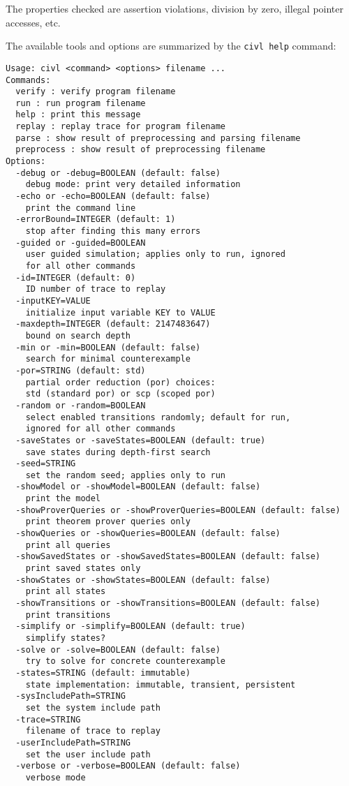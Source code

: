 \documentclass[11pt]{book}
\begin{document}
The properties checked are assertion violations, division by zero,
illegal pointer accesses, etc.

The available tools and options are summarized by the \texttt{civl
  help} command:

\begin{verbatim}
Usage: civl <command> <options> filename ...
Commands:
  verify : verify program filename
  run : run program filename
  help : print this message
  replay : replay trace for program filename
  parse : show result of preprocessing and parsing filename
  preprocess : show result of preprocessing filename
Options:
  -debug or -debug=BOOLEAN (default: false)
    debug mode: print very detailed information
  -echo or -echo=BOOLEAN (default: false)
    print the command line
  -errorBound=INTEGER (default: 1)
    stop after finding this many errors
  -guided or -guided=BOOLEAN
    user guided simulation; applies only to run, ignored
    for all other commands
  -id=INTEGER (default: 0)
    ID number of trace to replay
  -inputKEY=VALUE
    initialize input variable KEY to VALUE
  -maxdepth=INTEGER (default: 2147483647)
    bound on search depth
  -min or -min=BOOLEAN (default: false)
    search for minimal counterexample
  -por=STRING (default: std)
    partial order reduction (por) choices:
    std (standard por) or scp (scoped por)
  -random or -random=BOOLEAN
    select enabled transitions randomly; default for run,
    ignored for all other commands
  -saveStates or -saveStates=BOOLEAN (default: true)
    save states during depth-first search
  -seed=STRING
    set the random seed; applies only to run
  -showModel or -showModel=BOOLEAN (default: false)
    print the model
  -showProverQueries or -showProverQueries=BOOLEAN (default: false)
    print theorem prover queries only
  -showQueries or -showQueries=BOOLEAN (default: false)
    print all queries
  -showSavedStates or -showSavedStates=BOOLEAN (default: false)
    print saved states only
  -showStates or -showStates=BOOLEAN (default: false)
    print all states
  -showTransitions or -showTransitions=BOOLEAN (default: false)
    print transitions
  -simplify or -simplify=BOOLEAN (default: true)
    simplify states?
  -solve or -solve=BOOLEAN (default: false)
    try to solve for concrete counterexample
  -states=STRING (default: immutable)
    state implementation: immutable, transient, persistent
  -sysIncludePath=STRING
    set the system include path
  -trace=STRING
    filename of trace to replay
  -userIncludePath=STRING
    set the user include path
  -verbose or -verbose=BOOLEAN (default: false)
    verbose mode
\end{verbatim}
\end{document}
